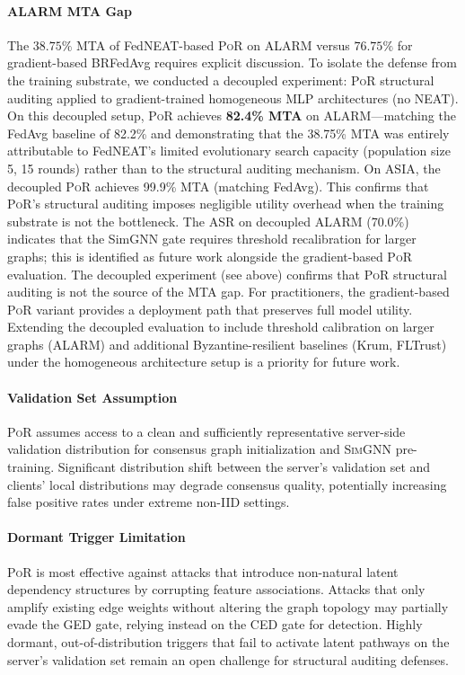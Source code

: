 \documentclass[journal]{IEEEtran}
\newcommand{\por}{\textsc{PoR}}
\newcommand{\simgnn}{\textsc{SimGNN}}
\begin{document}
\paragraph{ALARM MTA Gap}
The $38.75\%$ MTA of FedNEAT-based \por{} on ALARM versus $76.75\%$ for
gradient-based BRFedAvg requires explicit discussion. To isolate the
defense from the training substrate, we conducted a decoupled experiment:
\por{} structural auditing applied to gradient-trained homogeneous MLP
architectures (no NEAT). On this decoupled setup, \por{} achieves
\textbf{82.4\% MTA} on ALARM---matching the FedAvg baseline of 82.2\%
and demonstrating that the 38.75\% MTA was entirely attributable to
FedNEAT's limited evolutionary search capacity (population size 5,
15 rounds) rather than to the structural auditing mechanism. On ASIA,
the decoupled \por{} achieves 99.9\% MTA (matching FedAvg).
This confirms that \por{}'s structural auditing imposes negligible
utility overhead when the training substrate is not the bottleneck.
The ASR on decoupled ALARM (70.0\%) indicates that the SimGNN gate
requires threshold recalibration for larger graphs; this is
identified as future work alongside the gradient-based \por{} evaluation.
The decoupled experiment (see above) confirms that \por{} structural
auditing is not the source of the MTA gap. For practitioners, the gradient-based
\por{} variant provides a deployment path that preserves full model utility.
Extending the decoupled evaluation to include threshold calibration on
larger graphs (ALARM) and additional Byzantine-resilient baselines (Krum,
FLTrust) under the homogeneous architecture setup is a priority for
future work.

\paragraph{Validation Set Assumption}
\por{} assumes access to a clean and sufficiently representative server-side
validation distribution for consensus graph initialization and \simgnn{}
pre-training. Significant distribution shift between the server's validation
set and clients' local distributions may degrade consensus quality,
potentially increasing false positive rates under extreme non-IID settings.

\paragraph{Dormant Trigger Limitation}
\por{} is most effective against attacks that introduce non-natural latent
dependency structures by corrupting feature associations. Attacks that only
amplify existing edge weights without altering the graph topology may
partially evade the GED gate, relying instead on the CED gate for detection.
Highly dormant, out-of-distribution triggers that fail to activate latent
pathways on the server's validation set remain an open challenge for
structural auditing defenses.
\end{document}
